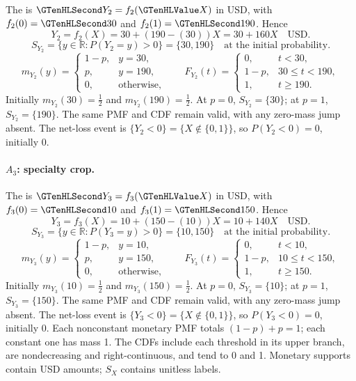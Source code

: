 The  is $\Money{Y_2}=f_2(\Indicator{X})$ in USD, with $f_2(0)=\Money{30}$ and $f_2(1)=\Money{190}$. Hence
\[Y_2=f_2(X)=30+(190-(30))X=30+160X\quad\text{USD}.\]
\[S_{Y_2}=\{y\in\mathbb R:P(Y_2=y)>0\}=\{30,190\}\quad\text{at the initial probability}.\]
\[m_{Y_2}(y)=\begin{cases}1-p,&y=30,\\p,&y=190,\\0,&\text{otherwise},\end{cases}\qquad F_{Y_2}(t)=\begin{cases}0,&t<30,\\1-p,&30\leq t<190,\\1,&t\geq 190.\end{cases}\]
Initially $m_{Y_2}(30)=\frac{1}{2}$ and $m_{Y_2}(190)=\frac{1}{2}$. At $p=0$, $S_{Y_2}=\{30\}$; at $p=1$, $S_{Y_2}=\{190\}$. The same PMF and CDF remain valid, with any zero-mass jump absent.
The net-loss event is $\{Y_2<0\}=\{X\notin\{0,1\}\}$, so $P(Y_2<0)=0$, initially $0$.
\paragraph{$A_3$: specialty crop.}
The  is $\Money{Y_3}=f_3(\Indicator{X})$ in USD, with $f_3(0)=\Money{10}$ and $f_3(1)=\Money{150}$. Hence
\[Y_3=f_3(X)=10+(150-(10))X=10+140X\quad\text{USD}.\]
\[S_{Y_3}=\{y\in\mathbb R:P(Y_3=y)>0\}=\{10,150\}\quad\text{at the initial probability}.\]
\[m_{Y_3}(y)=\begin{cases}1-p,&y=10,\\p,&y=150,\\0,&\text{otherwise},\end{cases}\qquad F_{Y_3}(t)=\begin{cases}0,&t<10,\\1-p,&10\leq t<150,\\1,&t\geq 150.\end{cases}\]
Initially $m_{Y_3}(10)=\frac{1}{2}$ and $m_{Y_3}(150)=\frac{1}{2}$. At $p=0$, $S_{Y_3}=\{10\}$; at $p=1$, $S_{Y_3}=\{150\}$. The same PMF and CDF remain valid, with any zero-mass jump absent.
The net-loss event is $\{Y_3<0\}=\{X\notin\{0,1\}\}$, so $P(Y_3<0)=0$, initially $0$.
Each nonconstant monetary PMF totals $(1-p)+p=1$; each constant one has mass 1. The CDFs include each threshold in its upper branch, are nondecreasing and right-continuous, and tend to 0 and 1. Monetary supports contain USD amounts; $S_X$ contains unitless labels.
